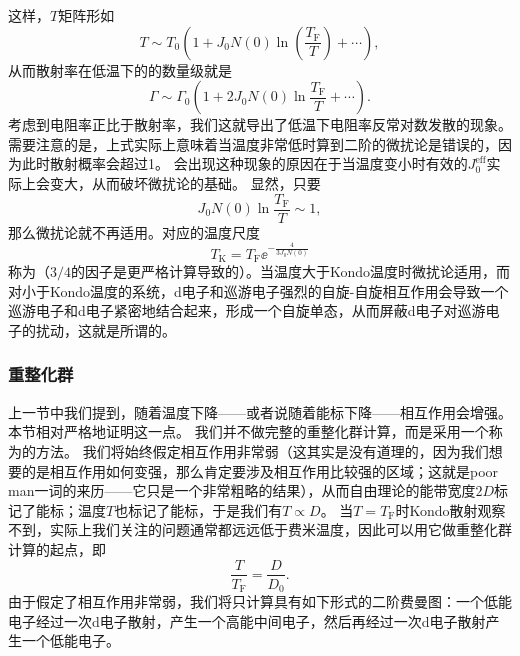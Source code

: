 这样，$T$矩阵形如
\[
    T \sim T_0 \left( 1 + J_0 N(0) \ln(\frac{T_\text{F}}{T}) + \cdots \right),
\]
从而散射率在低温下的的数量级就是
\begin{equation}
    \Gamma \sim \Gamma_0 \left(1 + 2 J_0 N(0) \ln \frac{T_\text{F}}{T} + \cdots \right).
\end{equation}
考虑到电阻率正比于散射率，我们这就导出了低温下电阻率反常对数发散的现象。
需要注意的是，上式实际上意味着当温度非常低时算到二阶的微扰论是错误的，因为此时散射概率会超过1。
会出现这种现象的原因在于当温度变小时有效的$J_{0}^\text{eff}$实际上会变大，从而破坏微扰论的基础。
显然，只要
\begin{equation}
    J_0 N(0) \ln \frac{T_\text{F}}{T} \sim 1,
\end{equation}
那么微扰论就不再适用。对应的温度尺度
\begin{equation}
    T_\text{K} = T_\text{F} \ee^{- \frac{4}{3J_0 N(0)}}
\end{equation}
称为（$3/4$的因子是更严格计算导致的）。当温度大于Kondo温度时微扰论适用，而对小于Kondo温度的系统，d电子和巡游电子强烈的自旋-自旋相互作用会导致一个巡游电子和d电子紧密地结合起来，形成一个自旋单态，从而屏蔽d电子对巡游电子的扰动，这就是所谓的。

\subsubsection{重整化群}

上一节中我们提到，随着温度下降——或者说随着能标下降——相互作用会增强。本节相对严格地证明这一点。
我们并不做完整的重整化群计算，而是采用一个称为的方法。
我们将始终假定相互作用非常弱（这其实是没有道理的，因为我们想要的是相互作用如何变强，那么肯定要涉及相互作用比较强的区域；这就是poor man一词的来历——它只是一个非常粗略的结果），从而自由理论的能带宽度$2 D$标记了能标；温度$T$也标记了能标，于是我们有$T \propto D$。
当$T=T_\text{F}$时Kondo散射观察不到，实际上我们关注的问题通常都远远低于费米温度，因此可以用它做重整化群计算的起点，即
\begin{equation}
    \frac{T}{T_\text{F}} = \frac{D}{D_0}.
\end{equation}
由于假定了相互作用非常弱，我们将只计算具有如下形式的二阶费曼图：一个低能电子经过一次d电子散射，产生一个高能中间电子，然后再经过一次d电子散射产生一个低能电子。

